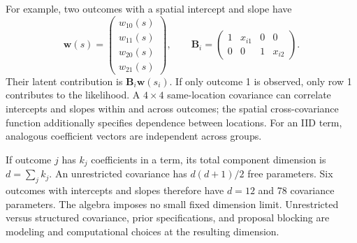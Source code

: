 \documentclass[11pt]{article}
\newcommand{\bw}{\bm{w}}
\newcommand{\bB}{\bm{B}}
\begin{document}
For example, two outcomes with a spatial intercept and slope have
\begin{equation}\label{eq:multivariate-svc-map}
 \bw(s)=\begin{pmatrix}w_{10}(s)\\w_{11}(s)\\w_{20}(s)\\w_{21}(s)\end{pmatrix},
 \qquad
 \bB_i=\begin{pmatrix}1&x_{i1}&0&0\\0&0&1&x_{i2}\end{pmatrix}.
\end{equation}
Their latent contribution is $\bB_i\bw(s_i)$. If only outcome 1 is observed,
only row 1 contributes to the likelihood. A $4\times4$ same-location covariance
can correlate intercepts and slopes within and across outcomes; the spatial
cross-covariance function additionally specifies dependence between locations.
For an IID term, analogous coefficient vectors are independent across groups.

If outcome $j$ has $k_j$ coefficients in a term, its total component dimension
is $d=\sum_j k_j$. An unrestricted covariance has $d(d+1)/2$ free parameters.
Six outcomes with intercepts and slopes therefore have $d=12$ and 78 covariance
parameters. The algebra imposes no small fixed dimension limit. Unrestricted
versus structured covariance, prior specifications, and proposal blocking are
modeling and computational choices at the resulting dimension.
\end{document}
